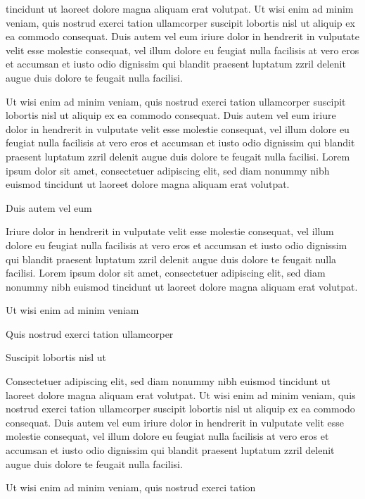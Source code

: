 \documentclass[11pt,twoside]{article}\makeatletter
\begin{document}
      tincidunt ut laoreet dolore magna aliquam erat volutpat. Ut wisi enim
      ad minim veniam, quis nostrud exerci tation ullamcorper suscipit
      lobortis nisl ut aliquip ex ea commodo consequat. Duis autem vel eum
      iriure dolor in hendrerit in vulputate velit esse molestie consequat,
      vel illum dolore eu feugiat nulla facilisis at vero eros et accumsan
      et iusto odio dignissim qui blandit praesent luptatum zzril delenit
      augue duis dolore te feugait nulla facilisi.\par Ut wisi enim ad minim veniam, quis nostrud exerci tation
      ullamcorper suscipit lobortis nisl ut aliquip ex ea commodo
      consequat. Duis autem vel eum iriure dolor in hendrerit in vulputate
      velit esse molestie consequat, vel illum dolore eu feugiat nulla
      facilisis at vero eros et accumsan et iusto odio dignissim qui blandit
      praesent luptatum zzril delenit augue duis dolore te feugait nulla
      facilisi. Lorem ipsum dolor sit amet, consectetuer adipiscing elit,
      sed diam nonummy nibh euismod tincidunt ut laoreet dolore magna
      aliquam erat volutpat. \par Duis autem vel eum \par Iriure dolor in hendrerit in vulputate velit esse molestie
      consequat, vel illum dolore eu feugiat nulla facilisis at vero eros et
      accumsan et iusto odio dignissim qui blandit praesent luptatum zzril
      delenit augue duis dolore te feugait nulla facilisi. Lorem ipsum dolor
      sit amet, consectetuer adipiscing elit, sed diam nonummy nibh euismod
      tincidunt ut laoreet dolore magna aliquam erat volutpat. \par Ut wisi enim ad minim veniam\par Quis nostrud exerci tation ullamcorper \par Suscipit lobortis nisl ut \par Consectetuer adipiscing elit, sed diam nonummy nibh euismod
      tincidunt ut laoreet dolore magna aliquam erat volutpat. Ut wisi enim
      ad minim veniam, quis nostrud exerci tation ullamcorper suscipit
      lobortis nisl ut aliquip ex ea commodo consequat. Duis autem vel eum
      iriure dolor in hendrerit in vulputate velit esse molestie consequat,
      vel illum dolore eu feugiat nulla facilisis at vero eros et accumsan
      et iusto odio dignissim qui blandit praesent luptatum zzril delenit
      augue duis dolore te feugait nulla facilisi.\par Ut wisi enim ad minim veniam, quis nostrud exerci tation
\end{document}
